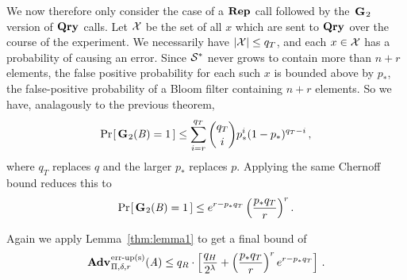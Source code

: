 We now therefore only consider the case of a $\textup{\textbf{Rep}}\hspace{0.5pt}$ call followed by the~$\textup{\textbf{G}}\hspace{0.5pt}_2$ version of $\textup{\textbf{Qry}}\hspace{0.5pt}$ calls. Let $\mathcal{X}$ be the set of all $x$ which are sent to $\textup{\textbf{Qry}}\hspace{0.5pt}$ over the course of the experiment. We necessarily have $|\mathcal{X}| \le q_T$, and each $x \in \mathcal{X}$ has a probability of causing an error. Since $\mathcal{S}^*$ never grows to contain more than $n+r$ elements, the false positive probability for each such $x$ is bounded above by $p_*$, the false-positive probability of a Bloom filter containing $n+r$ elements. So we have, analagously to the previous theorem,
\begin{equation}
   \Pr\hspace{-1pt}\left[\,\textup{\textbf{G}}\hspace{0.5pt}_2(\mathit{B})=1\,\right] \le
     \sum_{i=r}^{q_T} \binom{q_T}{i}p_*^i(1-p_*)^{q_T-i} \,,
\end{equation}
where $q_T$ replaces $q$ and the larger $p_*$ replaces $p$. Applying the same Chernoff bound reduces this to
\begin{equation}
   \Pr\hspace{-1pt}\left[\,\textup{\textbf{G}}\hspace{0.5pt}_2(\mathit{B})=1\,\right] \le
     e^{r-p_*q_T}\left(\frac{p_*q_T}{r}\right)^r.
\end{equation}

Again we apply Lemma~\ref{thm:lemma1} to get a final bound of
\begin{equation}
  \Adv{\erreps}_{\Pi,\delta,r}(\advA) \leq
    q_R \cdot \left[
      \frac{q_H}{2^\lambda} +
      \left(\frac{p_*q_T}{r}\right)^re^{r-p_*q_T}
    \right] \,.
\end{equation}